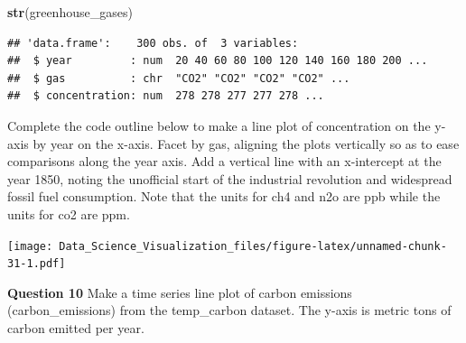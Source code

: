 \documentclass[
]{article}
\newenvironment{Shaded}{\begin{snugshade}}{\end{snugshade}}
\newcommand{\DataTypeTok}[1]{\textcolor[rgb]{0.13,0.29,0.53}{#1}}
\newcommand{\DecValTok}[1]{\textcolor[rgb]{0.00,0.00,0.81}{#1}}
\newcommand{\KeywordTok}[1]{\textcolor[rgb]{0.13,0.29,0.53}{\textbf{#1}}}
\newcommand{\NormalTok}[1]{#1}
\newcommand{\OperatorTok}[1]{\textcolor[rgb]{0.81,0.36,0.00}{\textbf{#1}}}
\newcommand{\StringTok}[1]{\textcolor[rgb]{0.31,0.60,0.02}{#1}}
\begin{document}
\begin{Shaded}
\begin{Highlighting}[]
\KeywordTok{str}\NormalTok{(greenhouse_gases)}
\end{Highlighting}
\end{Shaded}

\begin{verbatim}
## 'data.frame':    300 obs. of  3 variables:
##  $ year         : num  20 40 60 80 100 120 140 160 180 200 ...
##  $ gas          : chr  "CO2" "CO2" "CO2" "CO2" ...
##  $ concentration: num  278 278 277 277 278 ...
\end{verbatim}

Complete the code outline below to make a line plot of concentration on
the y-axis by year on the x-axis. Facet by gas, aligning the plots
vertically so as to ease comparisons along the year axis. Add a vertical
line with an x-intercept at the year 1850, noting the unofficial start
of the industrial revolution and widespread fossil fuel consumption.
Note that the units for ch4 and n2o are ppb while the units for co2 are
ppm.

\begin{Shaded}
\end{Shaded}

\texttt{[image: Data\_Science\_Visualization\_files/figure-latex/unnamed-chunk-31-1.pdf]}

\textbf{Question 10} Make a time series line plot of carbon emissions
(carbon\_emissions) from the temp\_carbon dataset. The y-axis is metric
tons of carbon emitted per year.
\end{document}
